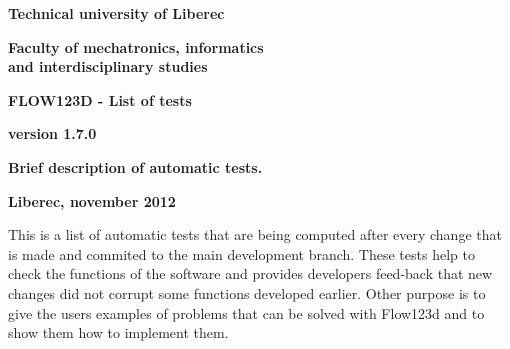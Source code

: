 \documentclass[12pt,a4paper]{report}
\begin{document}
\thispagestyle{empty}
\begin{center}
\noindent 
\textbf{\LARGE{
  Technical university of Liberec
}}

\vspace{2ex}
\textbf{\LARGE{
  Faculty of mechatronics, informatics\\
  and interdisciplinary studies
}}

\vspace{160pt}

\textbf{\Huge{
FLOW123D - List of tests
}}

\vspace{1cm}
\textbf{\Large{
version 1.7.0
}}

\vspace{1cm}

\textbf{\Large{
Brief description of automatic tests.
}}


\vspace{7cm}

\noindent \textbf{\Large{Liberec, november 2012}}

\vspace{1cm}


\end{center}
\noindent 

\newpage

This is a list of automatic tests that are being computed after every change that is made and commited to the main development branch. These tests help to check the functions of the software and provides developers feed-back that new changes did not corrupt some functions developed earlier. Other purpose is to give the users examples of problems that can be solved with Flow123d and to show them how to implement them. 
\end{document}
